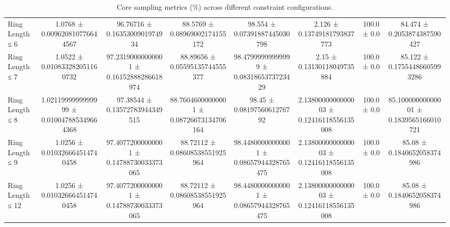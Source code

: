 \begin{table}[H]
\begin{tabular}{l c c c c c c c}
        Ring Length ≤ 6 & 1.0768 ± 0.009620810776644567 & 96.76716 ± 0.1635300901974934 & 88.5769 ± 0.08969002174155172 & 98.554 ± 0.07391887445030798 & 2.126 ± 0.13749181793837773 & 100.0 ± 0.0 & 84.474 ± 0.2053874387590427 \\
        Ring Length ≤ 7 & 1.0522 ± 0.010833282051160732 & 97.23190000000001 ± 0.16152888286618974 & 88.89656 ± 0.05595135744555377 & 98.47999999999999 ± 0.0831865373723429 & 2.15 ± 0.13130118049735884 & 100.0 ± 0.0 & 85.122 ± 0.17554486605993286 \\
        Ring Length ≤ 8 & 1.0211999999999999 ± 0.010047885349664368 & 97.38544 ± 0.13572783944349515 & 88.76046000000001 ± 0.08726673134706164 & 98.45 ± 0.0819756061276792 & 2.1380000000000003 ± 0.12416118556135008 & 100.0 ± 0.0 & 85.10000000000001 ± 0.1839565166010721 \\
        Ring Length ≤ 9 & 1.0256 ± 0.010326664514740458 & 97.40772000000001 ± 0.14788730033373065 & 88.72112 ± 0.08608538551925964 & 98.44800000000001 ± 0.08657944328765475 & 2.1380000000000003 ± 0.12416118556135008 & 100.0 ± 0.0 & 85.08 ± 0.1840652058374986 \\
        Ring Length ≤ 12 & 1.0256 ± 0.010326664514740458 & 97.40772000000001 ± 0.14788730033373065 & 88.72112 ± 0.08608538551925964 & 98.44800000000001 ± 0.08657944328765475 & 2.1380000000000003 ± 0.12416118556135008 & 100.0 ± 0.0 & 85.08 ± 0.1840652058374986 \\
        \bottomrule
    \end{tabular}
    \caption{Core sampling metrics (\%) across different constraint configurations.}
\end{table}